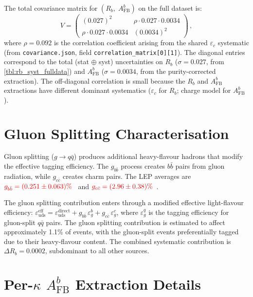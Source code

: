 \documentclass[11pt,a4paper]{article}
\newcommand{\external}[1]{\textcolor{red}{#1}}
\begin{document}
The total covariance matrix for
$(R_b,\; A_\text{FB}^b)$ on the full dataset is:
\begin{equation}
V = \begin{pmatrix}
(0.027)^2 & \rho \cdot 0.027 \cdot 0.0034 \\
\rho \cdot 0.027 \cdot 0.0034 & (0.0034)^2
\end{pmatrix}\,,
\label{eq:covariance}
\end{equation}
where $\rho = 0.092$ is the correlation coefficient arising
from the shared $\varepsilon_c$ systematic
(from \texttt{covariance.json}, field \texttt{correlation\_matrix[0][1]}).
The diagonal entries correspond to the total (stat $\oplus$ syst)
uncertainties on $R_b$ ($\sigma = 0.027$, from
\cref{tbl:rb_syst_fulldata}) and $A_\text{FB}^b$ ($\sigma = 0.0034$,
from the purity-corrected extraction).
The off-diagonal correlation is small because the $R_b$ and
$A_\text{FB}^b$ extractions have different dominant systematics
($\varepsilon_c$ for $R_b$; charge model for $A_\text{FB}^b$).

\section{Gluon Splitting Characterisation}
\label{app:gluon}

Gluon splitting ($g \to q\bar{q}$) produces additional heavy-flavour
hadrons that modify the effective tagging efficiency.
The $g_{b\bar{b}}$ process creates $b\bar{b}$ pairs from gluon
radiation, while $g_{c\bar{c}}$ creates charm pairs.
The LEP averages are
$\external{g_{b\bar{b}} = (0.251 \pm 0.063)\%}$~\cite{ALEPH:gbb}
and $\external{g_{c\bar{c}} = (2.96 \pm 0.38)\%}$~\cite{LEP:gcc}.

The gluon splitting contribution enters through a modified effective
light-flavour efficiency:
$\varepsilon_\text{uds}^\text{eff} = \varepsilon_\text{uds}^\text{direct}
+ g_{b\bar{b}}\,\varepsilon_g^b + g_{c\bar{c}}\,\varepsilon_g^c$,
where $\varepsilon_g^q$ is the tagging efficiency for gluon-split
$q\bar{q}$ pairs.
The gluon splitting contribution is estimated to affect
approximately 1.1\% of events, with the gluon-split events
preferentially tagged due to their heavy-flavour content.
The combined systematic contribution is $\Delta R_b = 0.0002$,
subdominant to all other sources.

\section{Per-$\kappa$ $A_\text{FB}^b$ Extraction Details}
\label{app:afb_details}
\end{document}
